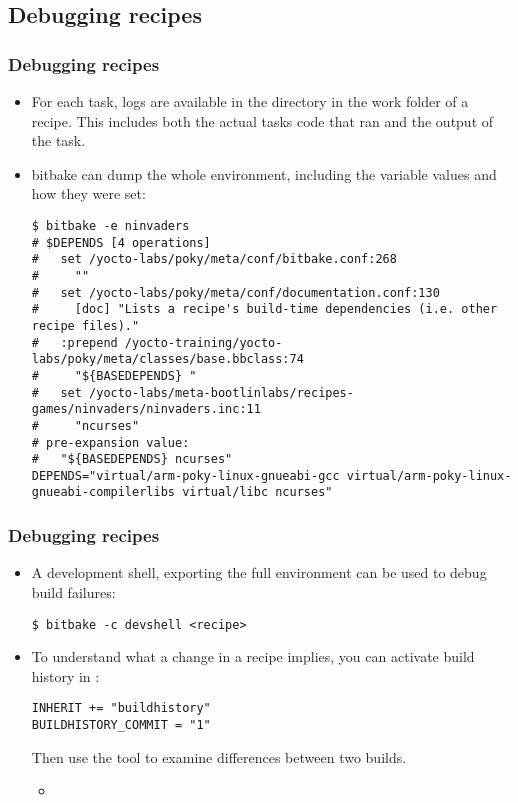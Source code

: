 \subsection{Debugging recipes}

\begin{frame}[fragile]
  \frametitle{Debugging recipes}
  \begin{itemize}
    \item For each task, logs are available in the 
      directory in the work folder of a recipe. This includes both
      the actual tasks code that ran and the output of the task.
    \item bitbake can dump the whole environment, including the
      variable values and how they were set:
      \begin{block}{}
        \begin{verbatim}
$ bitbake -e ninvaders
# $DEPENDS [4 operations]
#   set /yocto-labs/poky/meta/conf/bitbake.conf:268
#     ""
#   set /yocto-labs/poky/meta/conf/documentation.conf:130
#     [doc] "Lists a recipe's build-time dependencies (i.e. other recipe files)."
#   :prepend /yocto-training/yocto-labs/poky/meta/classes/base.bbclass:74
#     "${BASEDEPENDS} "
#   set /yocto-labs/meta-bootlinlabs/recipes-games/ninvaders/ninvaders.inc:11
#     "ncurses"
# pre-expansion value:
#   "${BASEDEPENDS} ncurses"
DEPENDS="virtual/arm-poky-linux-gnueabi-gcc virtual/arm-poky-linux-gnueabi-compilerlibs virtual/libc ncurses"
        \end{verbatim}
      \end{block}

  \end{itemize}
\end{frame}

\begin{frame}[fragile]
  \frametitle{Debugging recipes}
  \begin{itemize}
    \item A development shell, exporting the full environment can be
      used to debug build failures:
      \begin{block}{}
        \begin{verbatim}
$ bitbake -c devshell <recipe>
        \end{verbatim}
      \end{block}
    \item To understand what a change in a recipe implies, you can
      activate build history in :
      \begin{block}{}
        \begin{verbatim}
INHERIT += "buildhistory"
BUILDHISTORY_COMMIT = "1"
        \end{verbatim}
      \end{block}
      Then use the  tool to examine
      differences between two builds.
      \begin{itemize}
        \item {}
      \end{itemize}
  \end{itemize}
\end{frame}

